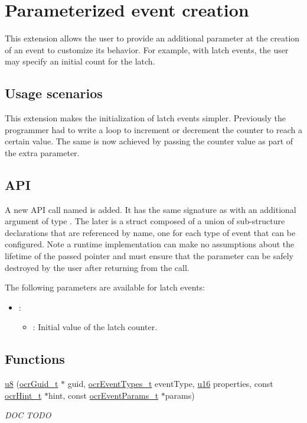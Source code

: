 \section{Parameterized event creation}
\label{sec:paramEvents}
This extension allows the user to provide an additional parameter at
the creation of an event to customize its behavior. For example, with
latch events, the user may specify an initial count for the latch.

\subsection{Usage scenarios}
This extension makes the initialization of latch events
simpler. Previously the programmer had to write a loop to increment or
decrement the counter to reach a certain value. The same is now
achieved by passing the counter value as part of the extra parameter.

\subsection{API}
A new API call named
\hyperlink{func_ocrEventCreateParams}{}
is added. It has the same signature as
\hyperlink{func_ocrEventCreate}{} with an
additional argument of type . The later is
a struct composed of a union of sub-structure declarations that are
referenced by name, one for each type of event that can be
configured. Note a runtime implementation can make no assumptions
about the lifetime of the passed pointer and must ensure that the
parameter can be safely destroyed by the user after returning from the call.

The following parameters are available for latch events:
\begin{itemize}
\item {}:
\begin{itemize}
\item {}: Initial value of the latch counter.
\end{itemize}
\end{itemize}

\subsection*{Functions}
\begin{DoxyCompactItemize}
\item
\hyperlink{type_u8}{u8} \hyperlink{func_ocrEventCreateParams}
{}(\hyperlink{type_ocrGuid_t}{ocr\-Guid\-\_\-t}
$\ast$ guid,
\hyperlink{type_ocrEventTypes_t}{ocrEventTypes\_t} eventType,
\hyperlink{type_u16}{u16} properties,
const \hyperlink{type_ocrHint_t}{ocr\-Hint\-\_\-t} $\ast$hint,
const \hyperlink{type_ocrEventParams_t}{ocrEventParams\_t} $\ast$params)
\begin{DoxyCompactList}
  \small \item \emph{DOC TODO}
\end{DoxyCompactList}
\end{DoxyCompactItemize}

